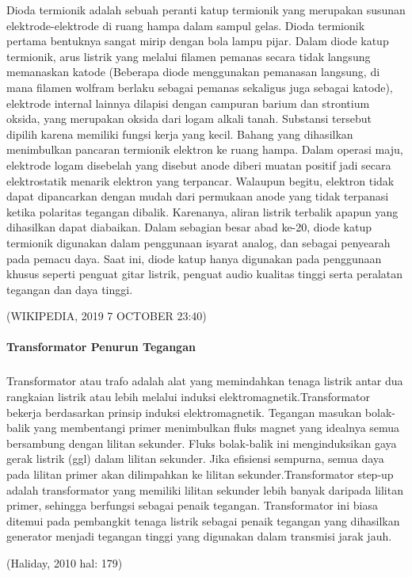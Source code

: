 \documentclass[12pt,a4paper]{article}
\begin{document}
	Dioda termionik adalah sebuah peranti katup termionik yang merupakan susunan elektrode-elektrode di ruang hampa dalam sampul gelas. Dioda termionik pertama bentuknya sangat mirip dengan bola lampu pijar. Dalam diode katup termionik, arus listrik yang melalui filamen pemanas secara tidak langsung memanaskan katode (Beberapa diode menggunakan pemanasan langsung, di mana filamen wolfram berlaku sebagai pemanas sekaligus juga sebagai katode), elektrode internal lainnya dilapisi dengan campuran barium dan strontium oksida, yang merupakan oksida dari logam alkali tanah. Substansi tersebut dipilih karena memiliki fungsi kerja yang kecil. Bahang yang dihasilkan menimbulkan pancaran termionik elektron ke ruang hampa. Dalam operasi maju, elektrode logam disebelah yang disebut anode diberi muatan positif jadi secara elektrostatik menarik elektron yang terpancar. Walaupun begitu, elektron tidak dapat dipancarkan dengan mudah dari permukaan anode yang tidak terpanasi ketika polaritas tegangan dibalik. Karenanya, aliran listrik terbalik apapun yang dihasilkan dapat diabaikan. Dalam sebagian besar abad ke-20, diode katup termionik digunakan dalam penggunaan isyarat analog, dan sebagai penyearah pada pemacu daya. Saat ini, diode katup hanya digunakan pada penggunaan khusus seperti penguat gitar listrik, penguat audio kualitas tinggi serta peralatan tegangan dan daya tinggi.
\begin{flushright}
(WIKIPEDIA, 2019 7 OCTOBER 23:40) 
\end{flushright}
\paragraph{ }
	\textbf{Transformator Penurun Tegangan}
\subparagraph{ }
	\begin{figure}
	
	\end{figure}
	Transformator atau trafo adalah alat yang memindahkan tenaga listrik antar dua rangkaian listrik atau lebih melalui induksi elektromagnetik.Transformator bekerja berdasarkan prinsip induksi elektromagnetik. Tegangan masukan bolak-balik yang membentangi primer menimbulkan fluks magnet yang idealnya semua bersambung dengan lilitan sekunder. Fluks bolak-balik ini menginduksikan gaya gerak listrik (ggl) dalam lilitan sekunder. Jika efisiensi sempurna, semua daya pada lilitan primer akan dilimpahkan ke lilitan sekunder.Transformator step-up adalah transformator yang memiliki lilitan sekunder lebih banyak daripada lilitan primer, sehingga berfungsi sebagai penaik tegangan. Transformator ini biasa ditemui pada pembangkit tenaga listrik sebagai penaik tegangan yang dihasilkan generator menjadi tegangan tinggi yang digunakan dalam transmisi jarak jauh.
\begin{flushright}
(Haliday, 2010 hal: 179) 
\end{flushright}
\end{document}
